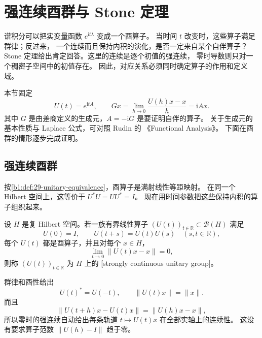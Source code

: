 \section{强连续酉群与 Stone 定理}
\label{b1:sec:2908}

谱积分可以把实变量函数 \(e^{\mathrm it\lambda}\) 变成一个酉算子。
当时间 \(t\) 改变时，这些算子满足群律；反过来，
一个连续而且保持内积的演化，是否一定来自某个自伴算子？
Stone 定理给出肯定回答。这里的连续是逐个初值的强连续，
零时导数则只对一个稠密子空间中的初值存在。
因此，对应关系必须同时确定算子的作用和定义域。

\ProseParagraphBreak

本节固定
\[
 U(t)=e^{\mathrm itA},\qquad
 Gx=\lim_{h\to0}\frac{U(h)x-x}{h}=\mathrm iAx.
\]
其中 \(G\) 是由差商定义的生成元，\(A=-\mathrm iG\) 是要证明自伴的算子。
关于生成元的基本性质与 Laplace 公式，可对照 Rudin 的
《Functional Analysis》\cite[Theorem~13.35, pp.~376--379; Theorem~13.38, pp.~382--385]{Rudin1991Functional}。
下面在酉群的情形逐步完成证明。

\subsection{强连续酉群}
\label{b1:subsec:290801}

按\cref{b1:def:29-unitary-equivalence}，酉算子是满射线性等距映射。
在同一个 Hilbert 空间上，这等价于 \(U^*U=UU^*=I\)。
现在用时间参数把这些保持内积的算子组织起来。

\begin{definition}[强连续酉群]
\label{b1:def:29-unitary-group}
设 \(H\) 是复 Hilbert 空间。若一族有界线性算子
\((U(t))_{t\in\mathbb R}\subset\mathcal B(H)\) 满足
\[
 U(0)=I,\qquad U(t+s)=U(t)U(s)\quad(s,t\in\mathbb R),
\]
每个 \(U(t)\) 都是酉算子，并且对每个 \(x\in H\)，
\[
 \lim_{t\to0}\|U(t)x-x\|=0,
\]
则称 \((U(t))_{t\in\mathbb R}\) 为 \(H\) 上的
[strongly continuous unitary group]。
\end{definition}

群律和酉性给出
\[
 U(t)^*=U(-t),\qquad \|U(t)x\|=\|x\|.
\]
而且
\[
 \|U(t+h)x-U(t)x\|=\|U(h)x-x\|,
\]
所以零时的强连续自动给出每条轨道 \(t\mapsto U(t)x\) 在全部实轴上的连续性。
这没有要求算子范数 \(\|U(h)-I\|\) 趋于零。

